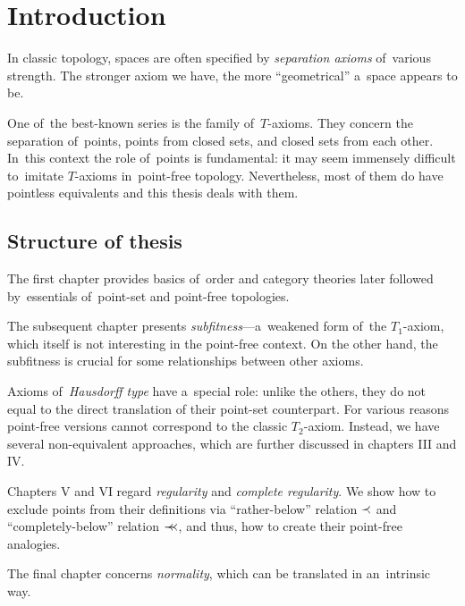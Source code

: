 \chapter*{Introduction}

In classic topology, spaces are often specified by \emph{separation axioms\/}
of~various strength.
The stronger axiom we have, the more ``geometrical'' a~space appears to be.

One of~the best-known series is the family of~$T$-axioms.
They concern the separation of~points, points from closed sets, and closed sets
from each other.
In~this context the role of~points is fundamental:
it may seem immensely difficult to~imitate $T$-axioms in~point-free topology.
Nevertheless, most of them do have pointless equivalents and this thesis deals
with them.

\section*{Structure of thesis}

The first chapter provides basics of~order and category theories later followed
by~essentials of~point-set and point-free topologies.

The subsequent chapter presents \emph{subfitness\/}---a~weakened form of~the
$T_1$-axiom, which itself is not interesting in the point-free context.
On the other hand, the subfitness is crucial for some relationships between
other axioms.

Axioms of~\emph{Hausdorff type\/} have a~special role:
unlike the others, they do not equal to the direct translation of their
point-set counterpart.
For various reasons point-free versions cannot correspond to the classic
$T_2$-axiom.
Instead, we have several non-equivalent approaches, which are further discussed
in chapters III and IV.

Chapters V and VI regard \emph{regularity\/} and \emph{complete regularity\/}.
We show how to exclude points from their definitions via ``rather-below''
relation $\prec$ and ``completely-below'' relation $\prec\mkern-8mu\prec$, and thus, how to create
their point-free analogies.

The final chapter concerns \emph{normality\/}, which can be translated in
an~intrinsic way.
